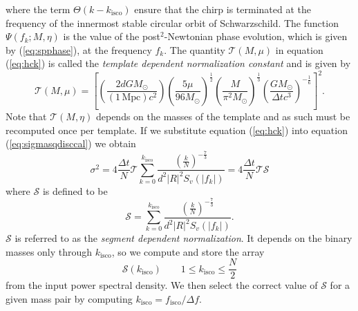 where the term $\Theta\left(k-k_\mathrm{isco}\right)$ ensure that the chirp is
terminated at the frequency of the innermost stable circular orbit of
Schwarzschild. The function $\Psi(f_k;M,\eta)$ is the value of the
post$^2$-Newtonian phase evolution, which is given by (\ref{eq:spphase}), at
the frequency $f_k$. The quantity $\mathcal{T}(M,\mu)$ in equation
(\ref{eq:hck}) is called the \emph{template dependent normalization constant}
and is given by
\begin{equation}
\mathcal{T}(M,\mu) = \left[
\left(\frac{2dGM_\odot}{(1\,\mathrm{Mpc})c^2}\right)
\left(\frac{5\mu}{96M_\odot}\right)^\frac{1}{2}
\left(\frac{M}{\pi^2M_\odot}\right)^\frac{1}{3}
\left(\frac{GM_\odot}{\Delta tc^3}\right)^{-\frac{1}{6}}
\right]^2.
\end{equation}
Note that $\mathcal{T}(M,\eta)$ depends on the masses of the template and as
such must be recomputed once per template. If we substitute equation
(\ref{eq:hck}) into equation (\ref{eq:sigmasqdisccal}) we obtain
\begin{equation}
\label{eq:sigmasqts}
\sigma^2 = 4 \frac{\Delta t}{N} \mathcal{T} 
\sum_{k=0}^{k_\mathrm{isco}} 
\frac{\left(\frac{k}{N}\right)^{-\frac{7}{3}}}
{d^2|R|^2S_v\left(\left|f_k\right|\right)}
= 4 \frac{\Delta t}{N} \mathcal{T} \mathcal{S}
\end{equation}
where $\mathcal{S}$ is defined to be
\begin{equation}
\mathcal{S} = 
\sum_{k=0}^{k_\mathrm{isco}} 
\frac{\left(\frac{k}{N}\right)^{-\frac{7}{3}}}{d^2|R|^2S_v\left(\left|f_k\right|\right)}.
\end{equation}
$\mathcal{S}$ is referred to as the \emph{segment dependent normalization}.
It depends on the binary masses only through $k_\mathrm{isco}$, so we compute
and store the array 
\begin{equation}
\mathcal{S}(k_\mathrm{isco}) \quad \quad 1 \le k_\mathrm{isco} \le \frac{N}{2}
\end{equation}
from the input power spectral density. We then select the correct value of
$\mathcal{S}$ for a given mass pair by computing $k_\mathrm{isco} =
f_\mathrm{isco} / \Delta f$.

